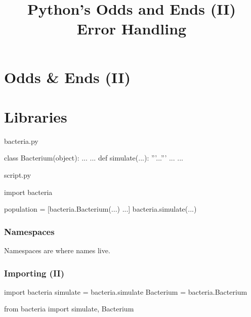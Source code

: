 
\title{Python's Odds and Ends (II)\\Error Handling}

\frame{\maketitle}

\section{Odds \& Ends (II)}

\section{Libraries}

\begin{frame}[fragile]

\begin{block}{bacteria.py}
\begin{python}
class Bacterium(object):
    ...
...
def simulate(...):
    '''...'''
    ...
...
\end{python}
\end{block}

\begin{block}{script.py}
\begin{python}
import bacteria

population = [bacteria.Bacterium(...) ...]
bacteria.simulate(...)
\end{python}
\end{block}

\end{frame}
\begin{frame}[fragile]
\frametitle{Namespaces}
Namespaces are where names live.
\end{frame}

\begin{frame}[fragile]
\frametitle{Importing (II)}

\begin{python}
import bacteria
simulate = bacteria.simulate
Bacterium = bacteria.Bacterium
\end{python}

\pause

\begin{python}
from bacteria import simulate, Bacterium
\end{python}

\end{frame}

